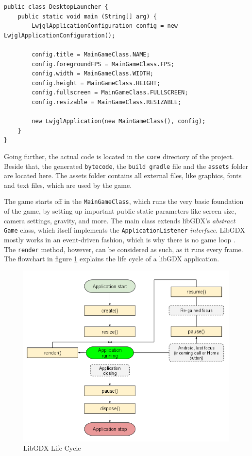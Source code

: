 \documentclass[12p]{article}
\begin{document}
\begin{verbatim}
public class DesktopLauncher {
	public static void main (String[] arg) {
		LwjglApplicationConfiguration config = new LwjglApplicationConfiguration();

		config.title = MainGameClass.NAME;
		config.foregroundFPS = MainGameClass.FPS;
		config.width = MainGameClass.WIDTH;
		config.height = MainGameClass.HEIGHT;
		config.fullscreen = MainGameClass.FULLSCREEN;
		config.resizable = MainGameClass.RESIZABLE;

		new LwjglApplication(new MainGameClass(), config);
	}
}
\end{verbatim}

Going further, the actual code is located in the \texttt{core} directory of the project. Beside that, the generated \texttt{bytecode}, the \texttt{build gradle} file and the \texttt{assets} folder are located here. The assets folder contains all external files, like graphics, fonts and text files, which are used by the game.

The game starts off in the \texttt{MainGameClass}, which runs the very basic foundation of the game, by setting up important public static parameters like screen size, camera settings, gravity, and more. The main class extends libGDX's \emph{abstract} \texttt{Game} class, which itself implements the \texttt{ApplicationListener} \emph{interface}. LibGDX mostly works in an event-driven fashion, which is why there is no game loop \cite{libGDXLifeCycle}. The \texttt{render} method, however, can be considered as such, as it runs every frame. The flowchart in figure \ref{fig:LibGDXLifeCycle} explains the life cycle of a libGDX application.

\begin{figure}[ht]
 \center
 \includegraphics[width=1\textwidth]{Documentation/lifeCycle}
 \caption{LibGDX Life Cycle \cite{libGDXLifeCycle}}
 \label{fig:LibGDXLifeCycle}
\end{figure}
\end{document}
